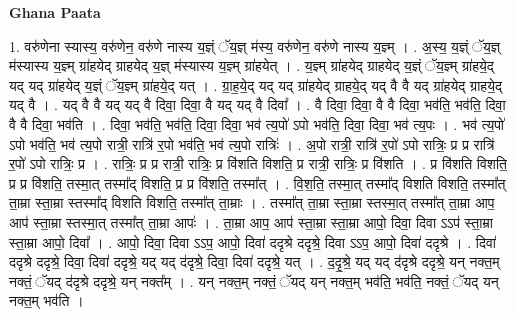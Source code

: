\documentclass[17pt]{extarticle}
\begin{document}
\textbf{Ghana Paata } \newline

1. वरु॑णेना स्यास्य॒ वरु॑णेन॒ वरु॑णे नास्य य॒ज्ञ्ं ॅय॒ज्ञ् म॑स्य॒ वरु॑णेन॒ वरु॑णे नास्य य॒ज्ञ्म् । . अ॒स्य॒ य॒ज्ञ्ं ॅय॒ज्ञ् म॑स्यास्य य॒ज्ञ्म् ग्रा॑हयेद् ग्राहयेद् य॒ज्ञ् म॑स्यास्य य॒ज्ञ्म् ग्रा॑हयेत् । . य॒ज्ञ्म् ग्रा॑हयेद् ग्राहयेद् य॒ज्ञ्ं ॅय॒ज्ञ्म् ग्रा॑हये॒द् यद् यद् ग्रा॑हयेद् य॒ज्ञ्ं ॅय॒ज्ञ्म् ग्रा॑हये॒द् यत् । . ग्रा॒ह॒ये॒द् यद् यद् ग्रा॑हयेद् ग्राहये॒द् यद् वै वै यद् ग्रा॑हयेद् ग्राहये॒द् यद् वै । . यद् वै वै यद् यद् वै दिवा॒ दिवा॒ वै यद् यद् वै दिवा᳚ । . वै दिवा॒ दिवा॒ वै वै दिवा॒ भव॑ति॒ भव॑ति॒ दिवा॒ वै वै दिवा॒ भव॑ति । . दिवा॒ भव॑ति॒ भव॑ति॒ दिवा॒ दिवा॒ भव॑ त्य॒पो॑ ऽपो भव॑ति॒ दिवा॒ दिवा॒ भव॑ त्य॒पः । . भव॑ त्य॒पो॑ ऽपो भव॑ति॒ भव॑ त्य॒पो रात्री॒ रात्रि॑ र॒पो भव॑ति॒ भव॑ त्य॒पो रात्रिः॑ । . अ॒पो रात्री॒ रात्रि॑ र॒पो॑ ऽपो रात्रिः॒ प्र प्र रात्रि॑ र॒पो॑ ऽपो रात्रिः॒ प्र । . रात्रिः॒ प्र प्र रात्री॒ रात्रिः॒ प्र वि॑शति विशति॒ प्र रात्री॒ रात्रिः॒ प्र वि॑शति । . प्र वि॑शति विशति॒ प्र प्र वि॑शति॒ तस्मा॒त् तस्मा᳚द् विशति॒ प्र प्र वि॑शति॒ तस्मा᳚त् । . वि॒श॒ति॒ तस्मा॒त् तस्मा᳚द् विशति विशति॒ तस्मा᳚त् ता॒म्रा स्ता॒म्रा स्तस्मा᳚द् विशति विशति॒ तस्मा᳚त् ता॒म्राः । . तस्मा᳚त् ता॒म्रा स्ता॒म्रा स्तस्मा॒त् तस्मा᳚त् ता॒म्रा आप॒ आप॑ स्ता॒म्रा स्तस्मा॒त् तस्मा᳚त् ता॒म्रा आपः॑ । . ता॒म्रा आप॒ आप॑ स्ता॒म्रा स्ता॒म्रा आपो॒ दिवा॒ दिवा ऽऽप॑ स्ता॒म्रा स्ता॒म्रा आपो॒ दिवा᳚ । . आपो॒ दिवा॒ दिवा ऽऽप॒ आपो॒ दिवा॑ ददृश्रे ददृश्रे॒ दिवा ऽऽप॒ आपो॒ दिवा॑ ददृश्रे । . दिवा॑ ददृश्रे ददृश्रे॒ दिवा॒ दिवा॑ ददृश्रे॒ यद् यद् द॑दृश्रे॒ दिवा॒ दिवा॑ ददृश्रे॒ यत् । . द॒दृ॒श्रे॒ यद् यद् द॑दृश्रे ददृश्रे॒ यन् नक्त॒म् नक्तं॒ ॅयद् द॑दृश्रे ददृश्रे॒ यन् नक्त᳚म् । . यन् नक्त॒म् नक्तं॒ ॅयद् यन् नक्त॒म् भव॑ति॒ भव॑ति॒ नक्तं॒ ॅयद् यन् नक्त॒म् भव॑ति । \newline
\end{document}
